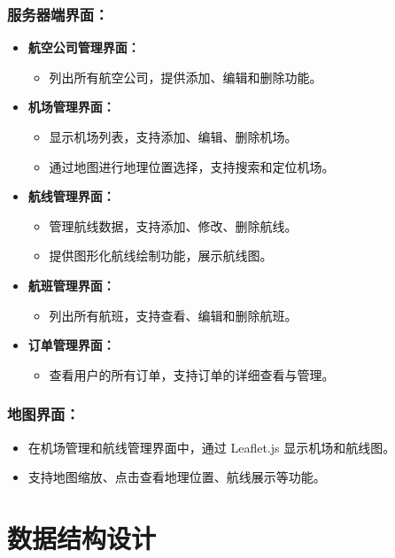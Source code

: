\documentclass[UTF8, a4paper,12pt]{ctexart}
\begin{document}
\subsubsection{服务器端界面：}
\begin{itemize}
    \item \textbf{航空公司管理界面：}
    \begin{itemize}
        \item 列出所有航空公司，提供添加、编辑和删除功能。
    \end{itemize}
    \item \textbf{机场管理界面：}
    \begin{itemize}
        \item 显示机场列表，支持添加、编辑、删除机场。
        \item 通过地图进行地理位置选择，支持搜索和定位机场。
    \end{itemize}
    \item \textbf{航线管理界面：}
    \begin{itemize}
        \item 管理航线数据，支持添加、修改、删除航线。
        \item 提供图形化航线绘制功能，展示航线图。
    \end{itemize}
    \item \textbf{航班管理界面：}
    \begin{itemize}
        \item 列出所有航班，支持查看、编辑和删除航班。
    \end{itemize}
    \item \textbf{订单管理界面：}
    \begin{itemize}
        \item 查看用户的所有订单，支持订单的详细查看与管理。
    \end{itemize}
\end{itemize}

\subsubsection{地图界面：}
\begin{itemize}
    \item 在机场管理和航线管理界面中，通过 Leaflet.js 显示机场和航线图。
    \item 支持地图缩放、点击查看地理位置、航线展示等功能。
\end{itemize}

\newpage


\section{数据结构设计}
\end{document}
